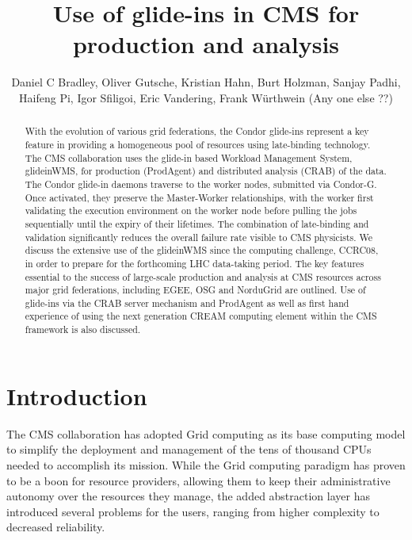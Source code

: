 \documentclass[a4paper]{jpconf}
\begin{document}
\title{Use of glide-ins in CMS for production and analysis \jpcs}

\author{Daniel C Bradley, Oliver Gutsche, Kristian Hahn, Burt Holzman, Sanjay Padhi, Haifeng Pi, Igor Sfiligoi, Eric Vandering, Frank W\"urthwein (Any one else ??)}

\address{UWM, FNAL, MIT, UCSD}


\begin{abstract}
With the evolution of various grid federations, the Condor glide-ins represent a key feature in providing a homogeneous pool of resources using late-binding technology. The CMS collaboration uses the glide-in based Workload Management System, glideinWMS, for production (ProdAgent) and distributed analysis (CRAB) of the data. The Condor glide-in daemons traverse to the worker nodes, submitted via Condor-G. Once activated, they preserve the Master-Worker relationships, with the worker first validating the execution environment on the worker node before pulling the jobs sequentially until the expiry of their lifetimes. The combination of late-binding and validation significantly reduces the overall failure rate visible to CMS physicists. We discuss the extensive use of the glideinWMS since the computing challenge, CCRC08, in order to prepare for the forthcoming LHC data-taking period. The key features essential to the success of large-scale production and analysis at CMS resources across major grid federations, including EGEE, OSG and NorduGrid are outlined. Use of glide-ins via the CRAB server mechanism and ProdAgent as well as first hand experience of using the next generation CREAM computing element within the CMS framework is also discussed.
\end{abstract}

\section{Introduction}

The CMS collaboration has adopted Grid computing as its base computing model to simplify the deployment and management of the
tens of thousand CPUs needed to accomplish its mission.
While the Grid computing paradigm has proven to be a boon for resource providers, 
allowing them to keep their administrative autonomy over the resources they manage,
the added abstraction layer has introduced several problems for the users, 
ranging from higher complexity to decreased reliability.
\end{document}
